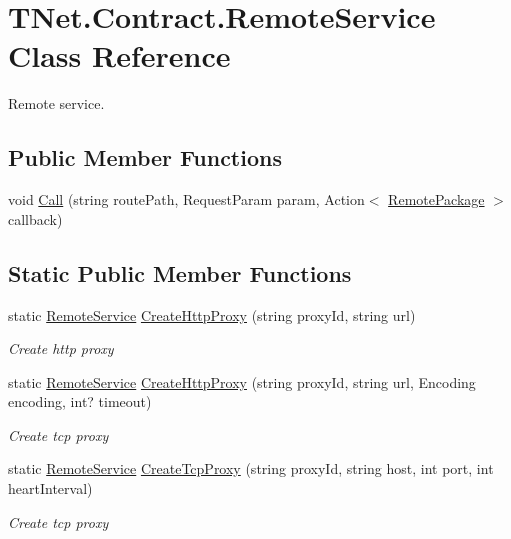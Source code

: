 \hypertarget{class_t_net_1_1_contract_1_1_remote_service}{}\section{T\+Net.\+Contract.\+Remote\+Service Class Reference}
\label{class_t_net_1_1_contract_1_1_remote_service}


Remote service.  


\subsection*{Public Member Functions}
\begin{DoxyCompactItemize}
\item 
void \mbox{\hyperlink{class_t_net_1_1_contract_1_1_remote_service_a32caa60c2d1d3110516eeb82022b7137}{Call}} (string route\+Path, Request\+Param param, Action$<$ \mbox{\hyperlink{class_t_net_1_1_contract_1_1_remote_package}{Remote\+Package}} $>$ callback)
\end{DoxyCompactItemize}
\subsection*{Static Public Member Functions}
\begin{DoxyCompactItemize}
\item 
static \mbox{\hyperlink{class_t_net_1_1_contract_1_1_remote_service}{Remote\+Service}} \mbox{\hyperlink{class_t_net_1_1_contract_1_1_remote_service_ad0b7ea44d67f1b4cf993a15df7ab0e64}{Create\+Http\+Proxy}} (string proxy\+Id, string url)
\begin{DoxyCompactList}\small\item\em Create http proxy \end{DoxyCompactList}\item 
static \mbox{\hyperlink{class_t_net_1_1_contract_1_1_remote_service}{Remote\+Service}} \mbox{\hyperlink{class_t_net_1_1_contract_1_1_remote_service_a868f0c715c9632a2a3542cd0546cc7ea}{Create\+Http\+Proxy}} (string proxy\+Id, string url, Encoding encoding, int? timeout)
\begin{DoxyCompactList}\small\item\em Create tcp proxy \end{DoxyCompactList}\item 
static \mbox{\hyperlink{class_t_net_1_1_contract_1_1_remote_service}{Remote\+Service}} \mbox{\hyperlink{class_t_net_1_1_contract_1_1_remote_service_a780d71828a6028cc3dc045fbc9c9dd2c}{Create\+Tcp\+Proxy}} (string proxy\+Id, string host, int port, int heart\+Interval)
\begin{DoxyCompactList}\small\item\em Create tcp proxy \end{DoxyCompactList}\end{DoxyCompactItemize}
